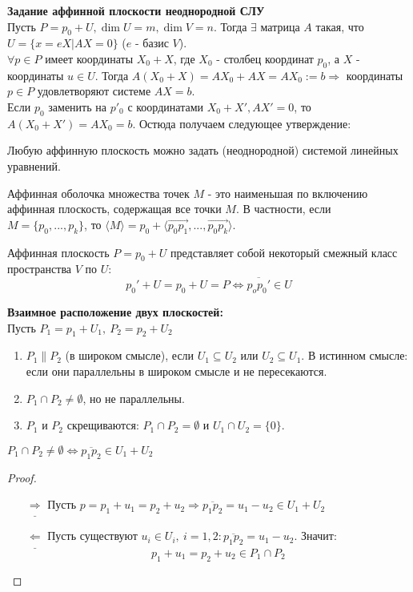 \textbf{Задание аффинной плоскости неоднородной СЛУ}\\
Пусть $P = p_0 + U, \dim U = m, \dim V = n$. Тогда $\exists$ матрица $A$ такая, что $U = \{x = eX | AX = 0\}$ ($e$ - базис $V$).\\
$\forall p \in P$ имеет координаты $X_0 + X$, где $X_0$ - столбец координат $p_0$, а $X$ - координаты $u \in U$.
Тогда $A(X_0 + X) = AX_0 + AX = AX_0 := b \Longrightarrow$ координаты $p \in P$ удовлетворяют системе $AX = b$.\\
Если $p_0$ заменить на $p'_0$ с координатами $X_0 + X', AX' = 0$, то $A(X_0 + X') = AX_0 = b$. Остюда получаем следующее утверждение:
\begin{subtheorem}
    Любую аффинную плоскость можно задать (неоднородной) системой линейных уравнений.
\end{subtheorem}
\begin{definition}
    Аффинная оболочка множества точек $M$ - это наименьшая по включению аффинная плоскость, содержащая все точки $M$. В частности, если $M = \{p_0,...,p_k\}$, то $\langle M \rangle = p_0 + \langle \overrightarrow{p_0p_1},...,\overrightarrow{p_0p_k} \rangle$.
\end{definition}


\newpage

\begin{remark}
    Аффинная плоскость $P=p_0+U$ представляет собой некоторый смежный класс пространства $V$ по $U$:
    \[p_0'+U=p_0+U=P \Longleftrightarrow  \overline{p_op_0'}\in U\]
\end{remark}
\textbf{Взаимное расположение двух плоскостей:}\\ 
Пусть $P_1=p_1+U_1,\ P_2=p_2+U_2$
\begin{enumerate}
    \item $P_1 \parallel P_2$ (в широком смысле), если $U_1\subseteq U_2$ или $U_2\subseteq U_1$. В истинном смысле: если они параллельны в широком смысле и не пересекаются. 
    \item $P_1 \cap P_2\ne \emptyset$, но не параллельны.
    \item $P_1$ и $P_2$ скрещиваются: $P_1\cap P_2=\emptyset$ и $U_1\cap U_2 =\{0\}$.
\end{enumerate}
\begin{subtheorem}
    $P_1\cap P_2\ne \emptyset \Longleftrightarrow \overline{p_1p_2}\in U_1+U_2$
\end{subtheorem} 
\begin{proof} \tab
    \begin{itemize}
        \item[$\underline{\Longrightarrow}$] Пусть $p=p_1+u_1=p_2+u_2 \Rightarrow \overline{p_1p_2}=u_1-u_2\in U_1+U_2$
        \item[$\underline{\Longleftarrow}$] Пусть существуют $u_i\in U_i,\ i=1,2: \overline{p_1p_2}=u_1-u_2$. 
        Значит:
        \[p_1+u_1=p_2+u_2\in P_1\cap P_2\]
    \end{itemize}
\end{proof}

